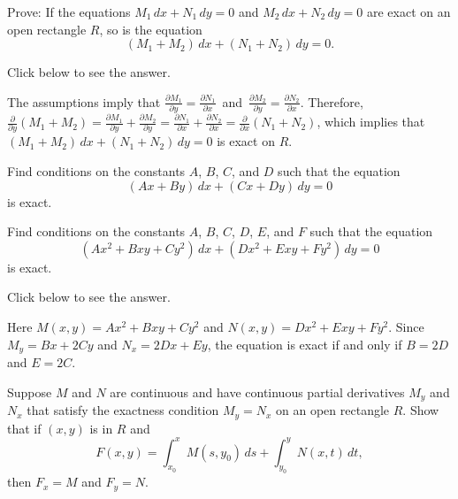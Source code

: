 \documentclass{ximera}
\begin{document}
\begin{problem}\label{exer:2.5.32}
Prove:  If the equations $M_1\,dx+N_1\,dy=0$ and $M_2\,
dx+N_2\,dy=0$ are exact on an open rectangle $R$,  so is
the equation $$(M_1+M_2)\,dx+(N_1+N_2)\,dy=0.$$

Click below to see the answer.

\begin{expandable}
The assumptions imply that
$\frac{\partial M_1}{\partial y}=\frac{\partial N_1}{\partial x}$\
and\ $\frac{\partial M_2}{\partial y}=\frac{\partial N_2}{\partial
x}$. Therefore, $\frac{\partial }{\partial
y}(M_1+M_2)=\frac{\partial M_1}{\partial y}+\frac{\partial
M_2}{\partial y}=\frac{\partial N_1}{\partial x}+\frac{\partial
N_2}{\partial x}=\frac{\partial }{\partial x}(N_1+N_2)$,
which implies that $(M_1+M_2)\,dx+(N_1+N_2)\,dy=0$ is exact on $R$.
\end{expandable}
\end{problem}

\begin{problem}\label{exer:2.5.33}
Find conditions on the constants $A$, $B$, $C$, and $D$ such that
the equation
$$
(Ax+By)\,dx+(Cx+Dy)\,dy=0
$$
is exact.
\end{problem}

\begin{problem}\label{exer:2.5.34}
Find conditions on the constants $A$, $B$, $C$, $D$, $E$, and
$F$ such that the equation
$$
(Ax^2+Bxy+Cy^2)\,dx+(Dx^2+Exy+Fy^2)\,dy=0
$$
is exact.

Click below to see the answer.

\begin{expandable}
    Here $M(x,y)=Ax^2+Bxy+Cy^2$ and
$N(x,y)=Dx^2+Exy+Fy^2$. Since $M_y=Bx+2Cy$ and $N_x=2Dx+Ey$, the
equation is exact if and only if $B=2D$ and $E=2C$.
\end{expandable}
\end{problem}

\begin{problem}\label{exer:2.5.35}
Suppose $M$ and $N$ are continuous and have continuous partial
derivatives $M_y$ and $N_x$ that satisfy the exactness condition
$M_y=N_x$ on an open rectangle $R$.
  Show that if $(x,y)$ is in $R$ and
$$
F(x,y)=\int^x_{x_0}M(s,y_0)\,ds+\int^y_{y_0}N(x,t)\,dt,
$$
then $F_x=M$ and $F_y=N$.
\end{problem}
\end{document}
